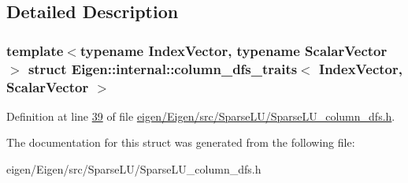 \subsection{Detailed Description}
\subsubsection*{template$<$typename Index\+Vector, typename Scalar\+Vector$>$\newline
struct Eigen\+::internal\+::column\+\_\+dfs\+\_\+traits$<$ Index\+Vector, Scalar\+Vector $>$}



Definition at line \hyperlink{eigen_2_eigen_2src_2_sparse_l_u_2_sparse_l_u__column__dfs_8h_source_l00039}{39} of file \hyperlink{eigen_2_eigen_2src_2_sparse_l_u_2_sparse_l_u__column__dfs_8h_source}{eigen/\+Eigen/src/\+Sparse\+L\+U/\+Sparse\+L\+U\+\_\+column\+\_\+dfs.\+h}.



The documentation for this struct was generated from the following file\+:\begin{DoxyCompactItemize}
\item 
eigen/\+Eigen/src/\+Sparse\+L\+U/\+Sparse\+L\+U\+\_\+column\+\_\+dfs.\+h\end{DoxyCompactItemize}
